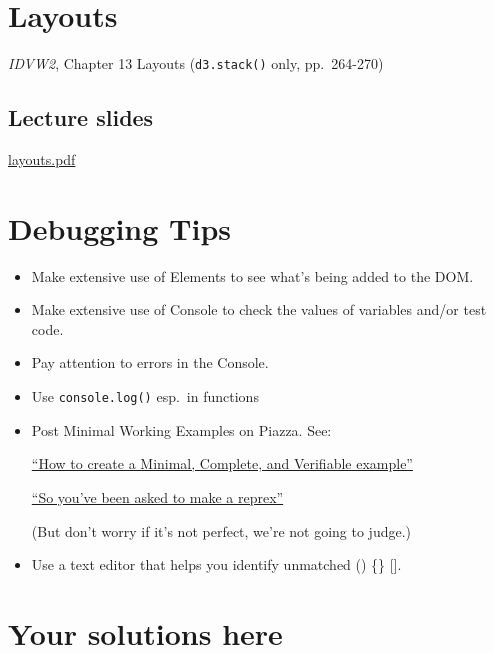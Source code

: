 \documentclass[
  openany]{book}
\begin{document}
\hypertarget{layouts}{%
\chapter{\texorpdfstring{Layouts }{Layouts }}\label{layouts}}

\emph{IDVW2}, Chapter 13 Layouts (\texttt{d3.stack()} only, pp.~264-270)

\hypertarget{lecture-slides-6}{%
\section{\texorpdfstring{Lecture slides }{Lecture slides }}\label{lecture-slides-6}}

\href{pdfs/layouts.pdf}{layouts.pdf}

\hypertarget{debugging-tips}{%
\chapter{\texorpdfstring{Debugging Tips }{Debugging Tips }}\label{debugging-tips}}

\begin{itemize}
\item
  Make extensive use of Elements to see what's being added to the DOM.
\item
  Make extensive use of Console to check the values of variables and/or test code.
\item
  Pay attention to errors in the Console.
\item
  Use \texttt{console.log()} esp.~in functions
\item
  Post Minimal Working Examples on Piazza. See:

  \href{https://stackoverflow.com/help/mcve}{``How to create a Minimal, Complete, and Verifiable example''}

  \href{https://www.jessemaegan.com/post/so-you-ve-been-asked-to-make-a-reprex/}{``So you've been asked to make a reprex''}

  (But don't worry if it's not perfect, we're not going to judge.)
\item
  Use a text editor that helps you identify unmatched () \{\} {[}{]}.
\end{itemize}

\hypertarget{your-solutions-here}{%
\chapter{\texorpdfstring{Your solutions here }{Your solutions here }}\label{your-solutions-here}}
\end{document}
